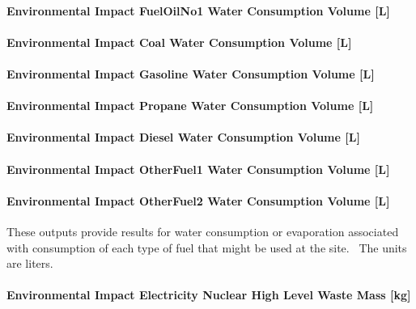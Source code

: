 \paragraph{Environmental Impact FuelOilNo1 Water Consumption Volume {[}L{]}}\label{environmental-impact-fuel-oil-1-water-consumption-volume-l}

\paragraph{Environmental Impact Coal Water Consumption Volume {[}L{]}}\label{environmental-impact-coal-water-consumption-volume-l}

\paragraph{Environmental Impact Gasoline Water Consumption Volume {[}L{]}}\label{environmental-impact-gasoline-water-consumption-volume-l}

\paragraph{Environmental Impact Propane Water Consumption Volume {[}L{]}}\label{environmental-impact-propane-water-consumption-volume-l}

\paragraph{Environmental Impact Diesel Water Consumption Volume {[}L{]}}\label{environmental-impact-diesel-water-consumption-volume-l}

\paragraph{Environmental Impact OtherFuel1 Water Consumption Volume {[}L{]}}\label{environmental-impact-otherfuel1-water-consumption-volume-l}

\paragraph{Environmental Impact OtherFuel2 Water Consumption Volume {[}L{]}}\label{environmental-impact-otherfuel2-water-consumption-volume-l}

These outputs provide results for water consumption or evaporation associated with consumption of each type of fuel that might be used at the site.~ The units are liters.

\paragraph{Environmental Impact Electricity Nuclear High Level Waste Mass {[}kg{]}}\label{environmental-impact-electricity-nuclear-high-level-waste-mass-kg}

